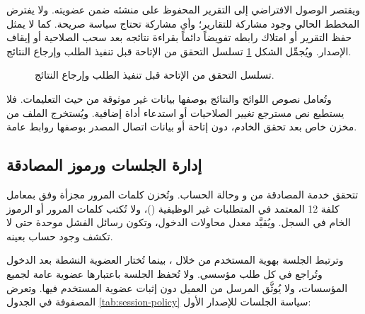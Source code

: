 ويقتصر الوصول الافتراضي إلى التقرير المحفوظ على منشئه ضمن عضويته. ولا يفترض المخطط الحالي وجود مشاركة للتقارير؛ وأي مشاركة تحتاج سياسة صريحة. كما لا يمثل حفظ التقرير أو امتلاك رابطه تفويضاً دائماً بقراءة نتائجه بعد سحب الصلاحية أو إيقاف الإصدار. ويُجمِّل الشكل \ref{fig:security-availability} تسلسل التحقق من الإتاحة قبل تنفيذ الطلب وإرجاع النتائج.

\begin{figure}[H]
  \centering
  
  \caption{تسلسل التحقق من الإتاحة قبل تنفيذ الطلب وإرجاع النتائج.}
  \label{fig:security-availability}
\end{figure}

وتُعامل نصوص اللوائح والنتائج بوصفها بيانات غير موثوقة من حيث التعليمات. فلا يستطيع نص مسترجع تغيير الصلاحيات أو استدعاء أداة إضافية. ويُستخرج الملف من مخزن خاص بعد تحقق الخادم، دون إتاحة  أو بيانات اتصال المصدر بوصفها روابط عامة.

\subsection{إدارة الجلسات ورموز المصادقة}
\label{subsec:auth-session}

تتحقق خدمة المصادقة من  و وحالة الحساب. وتُخزن كلمات المرور مجزأة وفق  بمعامل كلفة 12 المعتمد في المتطلبات غير الوظيفية ()، ولا تُكتب كلمات المرور أو الرموز الخام في السجل. ويُقيَّد معدل محاولات الدخول، وتكون رسائل الفشل موحدة حتى لا تكشف وجود حساب بعينه.

وترتبط الجلسة بهوية المستخدم من خلال ، بينما تُختار العضوية النشطة بعد الدخول وتُراجع في كل طلب مؤسسي. ولا تُحفظ الجلسة باعتبارها عضوية عامة لجميع المؤسسات، ولا يُوثَّق  المرسل من العميل دون إثبات عضوية المستخدم فيها. وتعرض المصفوفة في الجدول \ref{tab:session-policy} سياسة الجلسات للإصدار الأول:

